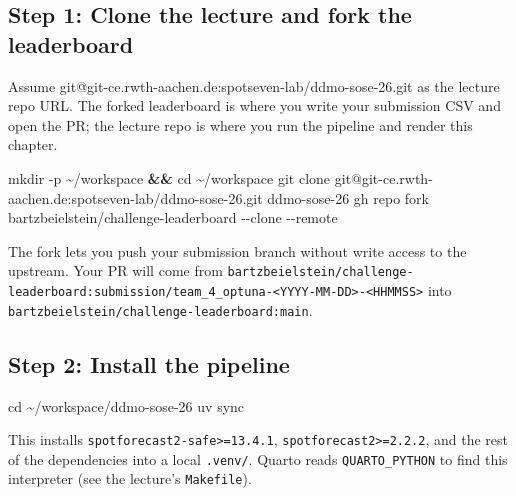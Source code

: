 \documentclass[
  english,
  letterpaper,
]{scrbook}
\newenvironment{Shaded}{\begin{snugshade}}{\end{snugshade}}
\newcommand{\AttributeTok}[1]{\textcolor[rgb]{0.40,0.45,0.13}{#1}}
\newcommand{\BuiltInTok}[1]{\textcolor[rgb]{0.00,0.23,0.31}{#1}}
\newcommand{\ExtensionTok}[1]{\textcolor[rgb]{0.00,0.23,0.31}{#1}}
\newcommand{\FunctionTok}[1]{\textcolor[rgb]{0.28,0.35,0.67}{#1}}
\newcommand{\KeywordTok}[1]{\textcolor[rgb]{0.00,0.23,0.31}{\textbf{#1}}}
\newcommand{\NormalTok}[1]{\textcolor[rgb]{0.00,0.23,0.31}{#1}}
\begin{document}
\subsection{Step 1: Clone the lecture and fork the
leaderboard}\label{step-1-clone-the-lecture-and-fork-the-leaderboard}

Assume git@git-ce.rwth-aachen.de:spotseven-lab/ddmo-sose-26.git as the
lecture repo URL. The forked leaderboard is where you write your
submission CSV and open the PR; the lecture repo is where you run the
pipeline and render this chapter.

\begin{Shaded}
\begin{Highlighting}[]
\FunctionTok{mkdir} \AttributeTok{{-}p}\NormalTok{ \textasciitilde{}/workspace }\KeywordTok{\&\&} \BuiltInTok{cd}\NormalTok{ \textasciitilde{}/workspace}
\FunctionTok{git}\NormalTok{ clone git@git{-}ce.rwth{-}aachen.de:spotseven{-}lab/ddmo{-}sose{-}26.git ddmo{-}sose{-}26}
\ExtensionTok{gh}\NormalTok{ repo fork bartzbeielstein/challenge{-}leaderboard }\AttributeTok{{-}{-}clone} \AttributeTok{{-}{-}remote}
\end{Highlighting}
\end{Shaded}

The fork lets you push your submission branch without write access to
the upstream. Your PR will come from
\texttt{bartzbeielstein/challenge-leaderboard:submission/team\_4\_optuna-\textless{}YYYY-MM-DD\textgreater{}-\textless{}HHMMSS\textgreater{}}
into \texttt{bartzbeielstein/challenge-leaderboard:main}.

\subsection{Step 2: Install the
pipeline}\label{step-2-install-the-pipeline}

\begin{Shaded}
\begin{Highlighting}[]
\BuiltInTok{cd}\NormalTok{ \textasciitilde{}/workspace/ddmo{-}sose{-}26}
\ExtensionTok{uv}\NormalTok{ sync}
\end{Highlighting}
\end{Shaded}

This installs \texttt{spotforecast2-safe\textgreater{}=13.4.1},
\texttt{spotforecast2\textgreater{}=2.2.2}, and the rest of the
dependencies into a local \texttt{.venv/}. Quarto reads
\texttt{QUARTO\_PYTHON} to find this interpreter (see the lecture's
\texttt{Makefile}).
\end{document}
